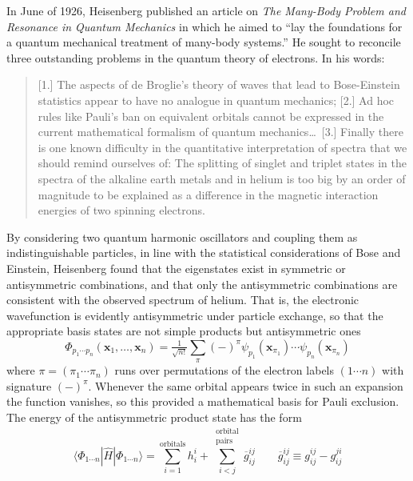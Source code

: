 In June of 1926, Heisenberg published an article on {\itshape The Many-Body
Problem and Resonance in Quantum Mechanics} in which he aimed to ``lay the
foundations for a quantum mechanical treatment of many-body
systems.''\cite{Heisenberg:1926p411}
He sought to reconcile three outstanding problems in the quantum theory of
electrons.
In his words:
\begin{quote}
    [1.] The aspects of de Broglie's theory of waves that lead to Bose-Einstein
    statistics appear to have no analogue in quantum mechanics;
    [2.] Ad hoc rules like Pauli's ban on equivalent orbitals cannot be
    expressed in the current mathematical formalism of quantum mechanics\dots\ 
    [3.] Finally there is one known difficulty in the quantitative
    interpretation of spectra that we should remind ourselves of:
    The splitting of singlet and triplet states in the spectra of the alkaline
    earth metals and in helium is too big by an order of magnitude to be
    explained as a difference in the magnetic interaction energies of two
    spinning electrons.\cite{Heisenberg:1926p411}
\end{quote}
By considering two quantum harmonic oscillators and coupling them as
indistinguishable particles, in line with the statistical considerations of Bose
and Einstein,\cite{Bose:1924p178,Einstein:1924p261,Einstein:1925p3} Heisenberg
found that the eigenstates exist in symmetric or antisymmetric combinations, and
that only the antisymmetric combinations are consistent with the observed
spectrum of helium.
That is, the electronic wavefunction is evidently antisymmetric under particle
exchange, so that the appropriate basis states are not simple products but
antisymmetric ones
\begin{equation}
    \Phi_{p_1\cdots p_n}(\mathbf{x}_1, \ldots, \mathbf{x}_n)
    =
    \tfrac{1}{\sqrt{n!}}
    \sum_\pi
    (-)^\pi
    \psi_{p_1}(\mathbf{x}_{\pi_1})
    \cdots
    \psi_{p_n}(\mathbf{x}_{\pi_n})
\end{equation}
where \(\pi=(\pi_1\cdots \pi_n)\) runs over permutations of the electron labels
\((1\cdots n)\) with signature \((-)^\pi\).
Whenever the same orbital appears twice in such an expansion the function
vanishes, so this provided a mathematical basis for Pauli exclusion.
The energy of the antisymmetric product state has the form
\begin{equation}
    \label{eq:introduction:determinant-expectation-value}
    \langle \Phi_{1\cdots n}|
    \hat{H}
    |\Phi_{1\cdots n} \rangle
    =
    \sum_{i=1}^\mathrm{orbitals}
    h_i^i
    +
    \sum_{i<j}^{\substack{\mathrm{orbital}\\\mathrm{pairs}}}
    \overline{g}_{ij}^{ij}
    \qquad
    \overline{g}_{ij}^{ij}
    \equiv
    g_{ij}^{ij}
    -
    g_{ij}^{ji}
\end{equation}
